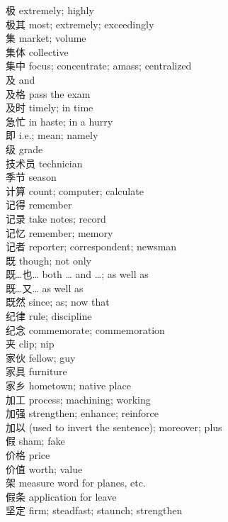极 \quad extremely; highly\\
极其 \quad most; extremely; exceedingly\\
集 \quad market; volume\\
集体 \quad collective\\
集中 \quad focus; concentrate; amass; centralized\\
及 \quad and\\
及格 \quad pass the exam\\
及时 \quad timely; in time\\
急忙 \quad in haste; in a hurry\\
即 \quad i.e.; mean; namely\\
级 \quad grade\\
技术员 \quad technician\\
季节 \quad season\\
计算 \quad count; computer; calculate\\
记得 \quad remember\\
记录 \quad take notes; record\\
记忆 \quad remember; memory\\
记者 \quad reporter; correspondent; newsman\\
既 \quad though; not only\\
既…也… \quad both … and …; as well as\\
既…又… \quad as well as\\
既然 \quad since; as; now that\\
纪律 \quad rule; discipline\\
纪念 \quad commemorate; commemoration\\
夹 \quad clip; nip\\
家伙 \quad fellow; guy\\
家具 \quad furniture\\
家乡 \quad hometown; native place\\
加工 \quad process; machining; working\\
加强 \quad strengthen; enhance; reinforce\\
加以 \quad (used to invert the sentence); moreover; plus\\
假 \quad sham; fake\\
价格 \quad price\\
价值 \quad worth; value\\
架 \quad measure word for planes, etc.\\
假条 \quad application for leave\\
坚定 \quad firm; steadfast; staunch; strengthen\\
